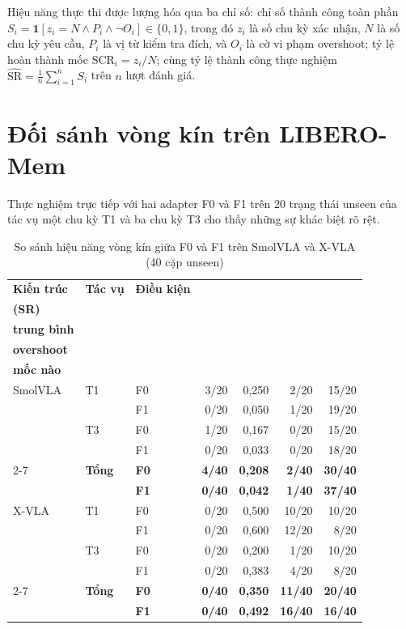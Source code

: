 Hiệu năng thực thi được lượng hóa qua ba chỉ số: chỉ số thành công toàn phần $S_i = \mathbf{1}[z_i = N \land P_i \land \neg O_i] \in \{0, 1\}$, trong đó $z_i$ là số chu kỳ xác nhận, $N$ là số chu kỳ yêu cầu, $P_i$ là vị từ kiểm tra đích, và $O_i$ là cờ vi phạm overshoot; tỷ lệ hoàn thành mốc $\mathrm{SCR}_i = z_i / N$; cùng tỷ lệ thành công thực nghiệm $\widehat{\mathrm{SR}} = \frac{1}{n}\sum_{i=1}^{n} S_i$ trên $n$ lượt đánh giá.

\section{Đối sánh vòng kín trên LIBERO-Mem}

Thực nghiệm trực tiếp với hai adapter F0 và F1 trên 20 trạng thái unseen của tác vụ một chu kỳ T1 và ba chu kỳ T3 cho thấy những sự khác biệt rõ rệt.
\begin{table}[htbp]
\centering\small
\caption{So sánh hiệu năng vòng kín giữa F0 và F1 trên SmolVLA và X-VLA (40 cặp unseen)}
\label{tab:e2-comparison}
\label{tab:e2-unseen-results}
\label{tab:xvla-e2-results}
\setlength{\tabcolsep}{4.5pt}
\begin{tabular}{l|l|l|r|r|r|r}
\toprule
\textbf{Kiến trúc} & \textbf{Tác vụ} & \textbf{Điều kiện} & \shortstack{\textbf{Thành công}\\\textbf{(SR)}} & \shortstack{\textbf{SCR}\\\textbf{trung bình}} & \shortstack{\textbf{Vi phạm}\\\textbf{overshoot}} & \shortstack{\textbf{Không đạt}\\\textbf{mốc nào}} \\
\midrule
SmolVLA & T1 & F0 & 3/20 & 0,250 & 2/20 & 15/20 \\
        &    & F1 & 0/20 & 0,050 & 1/20 & 19/20 \\
        & T3 & F0 & 1/20 & 0,167 & 0/20 & 15/20 \\
        &    & F1 & 0/20 & 0,033 & 0/20 & 18/20 \\
        \cmidrule{2-7}
        & \textbf{Tổng} & \textbf{F0} & \textbf{4/40} & \textbf{0,208} & \textbf{2/40} & \textbf{30/40} \\
        &               & \textbf{F1} & \textbf{0/40} & \textbf{0,042} & \textbf{1/40} & \textbf{37/40} \\
\midrule
X-VLA   & T1 & F0 & 0/20 & 0,500 & 10/20 & 10/20 \\
        &    & F1 & 0/20 & 0,600 & 12/20 & 8/20 \\
        & T3 & F0 & 0/20 & 0,200 & 1/20 & 10/20 \\
        &    & F1 & 0/20 & 0,383 & 4/20 & 8/20 \\
        \cmidrule{2-7}
        & \textbf{Tổng} & \textbf{F0} & \textbf{0/40} & \textbf{0,350} & \textbf{11/40} & \textbf{20/40} \\
        &               & \textbf{F1} & \textbf{0/40} & \textbf{0,492} & \textbf{16/40} & \textbf{16/40} \\
\bottomrule
\end{tabular}
\end{table}

